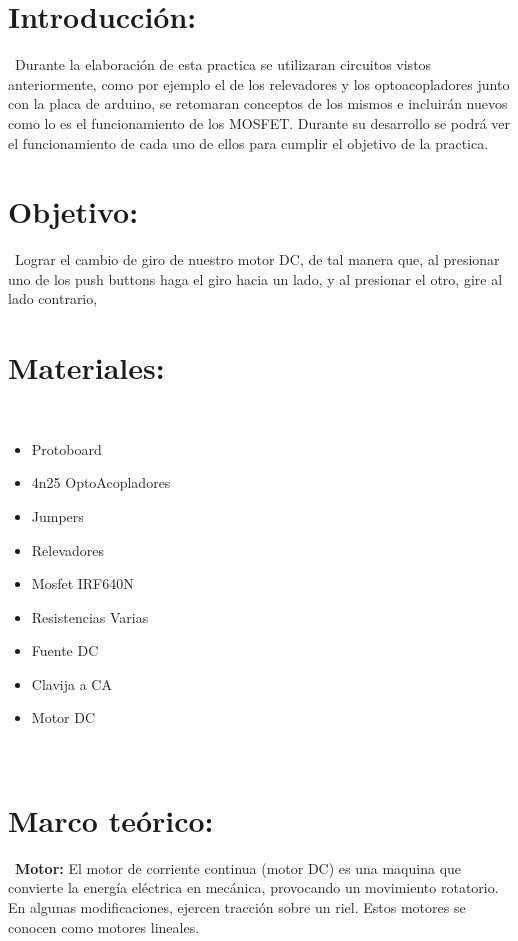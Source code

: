\documentclass[12pt,letterpaper]{article}
\begin{document}
\newpage

\section{Introducción:}
\
Durante la elaboración de esta practica se utilizaran circuitos vistos anteriormente, como por ejemplo el de los relevadores y los optoacopladores junto con la placa de arduino, se retomaran conceptos de los mismos e incluirán nuevos como lo es el funcionamiento de los MOSFET. Durante su desarrollo se podrá ver el funcionamiento de cada uno de ellos para cumplir el objetivo de la practica.

\section{Objetivo:}
\
Lograr el cambio de giro de nuestro motor DC, de tal manera que, al presionar uno de los push buttons haga el giro hacia un lado, y al presionar el otro, gire al lado contrario,

\section{Materiales:}
\
\begin{itemize}
\item Protoboard
\item 4n25 OptoAcopladores
\item Jumpers
\item Relevadores
\item Mosfet IRF640N
\item Resistencias Varias
\item Fuente DC
\item Clavija a CA
\item Motor DC
\end{itemize}
\
\section{Marco teórico:}
\
\textbf{Motor:} El motor de corriente continua (motor DC) es una maquina que convierte la energía eléctrica en mecánica, provocando un movimiento rotatorio. En algunas modificaciones, ejercen tracción sobre un riel. Estos motores se conocen como motores lineales.
\end{document}
